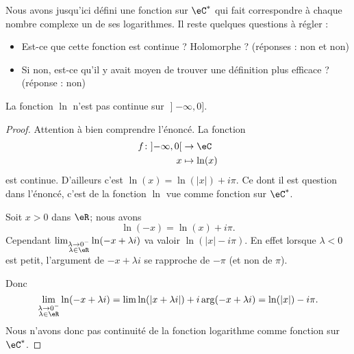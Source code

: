 Nous avons jusqu'ici défini une fonction sur \( \eC^*\) qui fait correspondre à chaque nombre complexe un de ses logarithmes. Il reste quelques questions à régler :
\begin{itemize}
    \item Est-ce que cette fonction est continue ? Holomorphe ? (réponses : non et non)
    \item Si non, est-ce qu'il y avait moyen de trouver une définition plus efficace ? (réponse : non)
\end{itemize}

\begin{lemma}       \label{LEMooMUOIooCnoWwq}
La fonction \( \ln\) n'est pas continue sur \( \mathopen] -\infty , 0 \mathclose]\).
\end{lemma}

\begin{proof}
    Attention à bien comprendre l'énoncé. La fonction
    \begin{equation}
        \begin{aligned}
        f\colon \mathopen] -\infty , 0 \mathclose[&\to \eC \\
            x&\mapsto \ln(x)
        \end{aligned}
    \end{equation}
    est continue. D'ailleurs c'est \( \ln(x)=\ln(| x |)+i\pi\). Ce dont il est question dans l'énoncé, c'est de la fonction \( \ln\) vue comme fonction sur \( \eC^*\).

    Soit \( x>0\) dans \( \eR\); nous avons
    \begin{equation}
        \ln(-x)=\ln(x)+i\pi.
    \end{equation}
    Cependant \( \lim_{\substack{\lambda\to 0^-\\\lambda\in \eR}}\ln(-x+\lambda i) \) va valoir \( \ln(| x |-i\pi)\). En effet lorsque \( \lambda<0\) est petit, l'argument de \( -x+\lambda i\) se rapproche de \( -\pi\) (et non de \( \pi\)).

\begin{center}
   
\end{center}

Donc
\begin{equation}
    \lim_{\substack{\lambda\to 0^-\\\lambda\in \eR}}\ln(-x+\lambda i)=\lim \ln(| x+\lambda i |)+i\arg(-x+\lambda i)=\ln(| x |)-i\pi.
\end{equation}
Nous n'avons donc pas continuité de la fonction logarithme comme fonction sur \( \eC^*\).
\end{proof}

